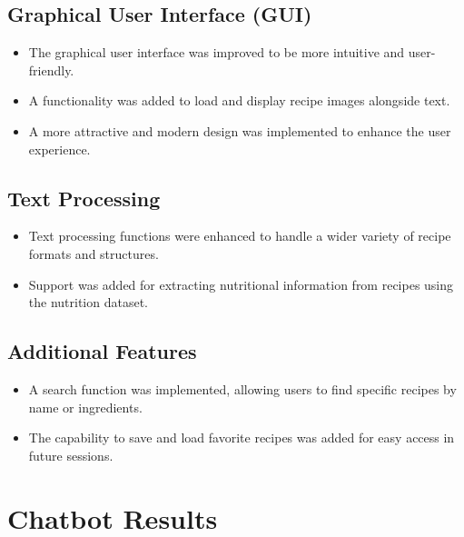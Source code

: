 \documentclass{article}
\begin{document}
\subsection{Graphical User Interface (GUI)}

\begin{itemize}
    \item The graphical user interface was improved to be more intuitive and user-friendly.
    \item A functionality was added to load and display recipe images alongside text.
    \item A more attractive and modern design was implemented to enhance the user experience.
\end{itemize}

\subsection{Text Processing}

\begin{itemize}
    \item Text processing functions were enhanced to handle a wider variety of recipe formats and structures.
    \item Support was added for extracting nutritional information from recipes using the nutrition dataset.
\end{itemize}

\subsection{Additional Features}

\begin{itemize}
    \item A search function was implemented, allowing users to find specific recipes by name or ingredients.
    \item The capability to save and load favorite recipes was added for easy access in future sessions.
\end{itemize}

\section{Chatbot Results}
\end{document}
